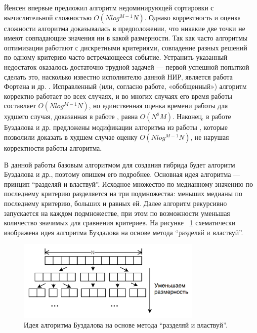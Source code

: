 Йенсен \cite{Jensen} впервые предложил алгоритм недоминирующей сортировки с вычислительной сложностью $O(N log^{M-1} N)$. Однако корректность и оценка сложности алгоритма доказывалась в предположении, что никакие две точки не имеют совпадающие значения ни в какой размерности. Так как часто алгоритмы оптимизации работают с дискретными критериями, совпадение разных решений по одному критерию часто встречающееся событие. Устранить указанный недостаток оказалось достаточно трудной задачей — первой успешной попыткой сделать это, насколько известно исполнителю данной НИР, является работа Фортена и др. \cite{Forton}. Исправленный (или, согласно работе, «обобщенный») алгоритм корректно работает во всех случаях, и во многих случаях его время работы составляет $O(N log^{M-1} N)$, но единственная оценка времени работы для худшего случая, доказанная в работе \cite{Jensen}, равна $O(N^2M)$. Наконец, в работе Буздалова и др. \cite{Buzdalov} предложены модификации алгоритма из работы \cite{Jensen}, которые позволили доказать в худшем случае оценку $O(N log^{M-1} N)$, не нарушая корректности работы алгоритма.

В данной работы базовым алгоритмом для создания гибрида будет алгоритм Буздалова и др., поэтому опишем его подробнее. Основная идея алгоритма {---} принцип ``разделяй и властвуй''. Исходное множество по медианному значению по последнему критерию разделяется на три подмножества: меньших медианы по последнему критерию, больших и равных ей. Далее алгоритм рекурсивно запускается на каждом подмножестве, при этом по возможности уменьшая количество значимых для сравнения критериев. На рисунке ~\ref{fast_pic} схематически изображена идея алгоритма Буздалова на основе метода ``разделяй и властвуй''.

\begin{figure}[!h]
\begin{center}
\includegraphics[width=9cm]{pic/fast_pic.png}
\caption{Идея алгоритма Буздалова на основе метода ``разделяй и властвуй''.}
\label{fast_pic}
\end{center}
\end{figure}


